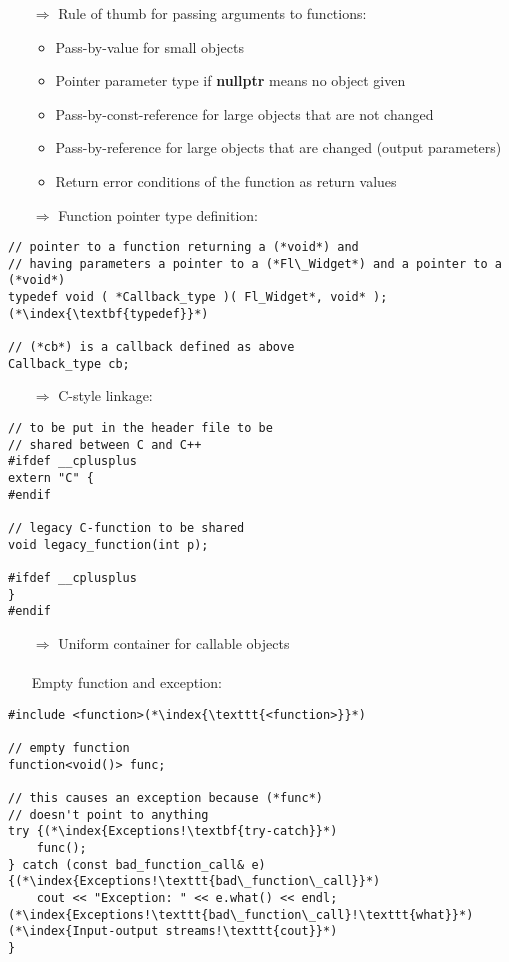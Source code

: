 \documentclass[10pt]{article}
\begin{document}
\begin{enumerate}
\item[$\Rightarrow$] Rule of thumb for passing arguments to functions:
\begin{itemize}
\item Pass-by-value for small objects
\item Pointer parameter type if \textbf{nullptr} means no object given
\item Pass-by-const-reference for large objects that are not changed
\item Pass-by-reference for large objects that are changed (output parameters)
\item Return error conditions of the function as return values
\end{itemize}
\end{enumerate}
\begin{enumerate}
\item[$\Rightarrow$] Function pointer type definition:
\end{enumerate}
\begin{lstlisting}
// pointer to a function returning a (*void*) and
// having parameters a pointer to a (*Fl\_Widget*) and a pointer to a (*void*)
typedef void ( *Callback_type )( Fl_Widget*, void* ); (*\index{\textbf{typedef}}*)

// (*cb*) is a callback defined as above
Callback_type cb;
\end{lstlisting}
\begin{enumerate}
\item[$\Rightarrow$] C-style linkage:
\end{enumerate}
\begin{lstlisting}
// to be put in the header file to be
// shared between C and C++
#ifdef __cplusplus
extern "C" {
#endif

// legacy C-function to be shared
void legacy_function(int p);

#ifdef __cplusplus
}
#endif
\end{lstlisting}
\begin{enumerate}
\item[$\Rightarrow$] Uniform container for callable objects\\ \\ Empty function and exception:
\end{enumerate}
\begin{lstlisting}
#include <function>(*\index{\texttt{<function>}}*)

// empty function
function<void()> func;

// this causes an exception because (*func*) 
// doesn't point to anything
try {(*\index{Exceptions!\textbf{try-catch}}*)
    func();
} catch (const bad_function_call& e) {(*\index{Exceptions!\texttt{bad\_function\_call}}*)
    cout << "Exception: " << e.what() << endl;(*\index{Exceptions!\texttt{bad\_function\_call}!\texttt{what}}*)(*\index{Input-output streams!\texttt{cout}}*)
}
\end{lstlisting}
\end{document}
